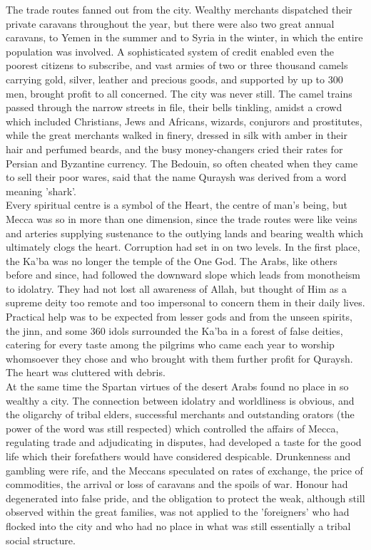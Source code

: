 \documentclass[10pt, twoside,openright]{book}
\begin{document}
The trade routes fanned out from the city. Wealthy merchants dispatched their private caravans 
throughout the year, but there were also two great annual caravans, to Yemen in the summer and to 
Syria in the winter, in which the entire population was involved. A sophisticated system of credit 
enabled even the poorest citizens to subscribe, and vast armies of two or three thousand camels 
carrying gold, silver, leather and precious goods, and supported by up to 300 men, brought profit to 
all concerned. The city was never still. The camel trains passed through the narrow streets in file, 
their bells tinkling, amidst a crowd which included Christians, Jews and Africans, wizards, conjurors 
and prostitutes, while the great merchants walked in finery, dressed in silk with amber in their hair 
and perfumed beards, and the busy money\hyp{}changers cried their rates for Persian and Byzantine 
currency. The Bedouin, so often cheated when they came to sell their poor wares, said that the name 
Quraysh was derived from a word meaning 'shark'. \\

Every spiritual centre is a symbol of the Heart, the centre of man's being, but Mecca was so in more 
than one dimension, since the trade routes were like veins and arteries supplying sustenance to the 
outlying lands and bearing wealth which ultimately clogs the heart. Corruption had set in on two 
levels. In the first place, the Ka'ba was no longer the temple of the One God. The Arabs, like others 
before and since, had followed the downward slope which leads from monotheism to idolatry. They had 
not lost all awareness of Allah, but thought of Him as a supreme deity too remote and too impersonal 
to concern them in their daily lives. Practical help was to be expected from lesser gods and from the 
unseen spirits, the jinn, and some 360 idols surrounded the Ka'ba in a forest of false deities, 
catering for every taste among the pilgrims who came each year to worship whomsoever they chose and 
who brought with them further profit for Quraysh. The heart was cluttered with debris. \\

At the same time the Spartan virtues of the desert Arabs found no place in so wealthy a city. The 
connection between idolatry and worldliness is obvious, and the oligarchy of tribal elders, 
successful merchants and outstanding orators (the power of the word was still respected) which 
controlled the affairs of Mecca, regulating trade and adjudicating in disputes, had developed a taste 
for the good life which their forefathers would have considered despicable. Drunkenness and gambling 
were rife, and the Meccans speculated on rates of exchange, the price of commodities, the arrival or 
loss of caravans and the spoils of war. Honour had degenerated into false pride, and the obligation 
to protect the weak, although still observed within the great families, was not applied to the 
'foreigners' who had flocked into the city and who had no place in what was still essentially a 
tribal social structure. \\
\end{document}
